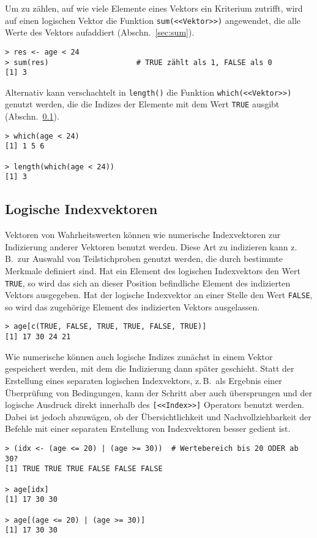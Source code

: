 Um zu zählen, auf wie viele Elemente eines Vektors ein Kriterium zutrifft, wird auf einen logischen Vektor die Funktion \lstinline!sum(<<Vektor>>)! angewendet, die alle Werte des Vektors aufaddiert (Abschn.\ \ref{sec:sum}).
\begin{lstlisting}
> res <- age < 24
> sum(res)                    # TRUE zählt als 1, FALSE als 0
[1] 3
\end{lstlisting}

Alternativ kann verschachtelt in \lstinline!length()! die Funktion \lstinline!which(<<Vektor>>)! genutzt werden, die die Indizes der Elemente mit dem Wert \lstinline!TRUE! ausgibt (Abschn.\ \ref{sec:which}).
\begin{lstlisting}
> which(age < 24)
[1] 1 5 6

> length(which(age < 24))
[1] 3
\end{lstlisting}

\subsection{Logische Indexvektoren}
\label{sec:which}

Vektoren von Wahrheitswerten können wie numerische Indexvektoren zur Indizierung anderer Vektoren benutzt werden. Diese Art zu indizieren kann z.\,B.\ zur Auswahl von Teilstichproben genutzt werden, die durch bestimmte Merkmale definiert sind. Hat ein Element des logischen Indexvektors den Wert \lstinline!TRUE!, so wird das sich an dieser Position befindliche Element des indizierten Vektors ausgegeben. Hat der logische Indexvektor an einer Stelle den Wert \lstinline!FALSE!, so wird das zugehörige Element des indizierten Vektors ausgelassen.
\begin{lstlisting}
> age[c(TRUE, FALSE, TRUE, TRUE, FALSE, TRUE)]
[1] 17 30 24 21
\end{lstlisting}

Wie numerische können auch logische Indizes zunächst in einem Vektor gespeichert werden, mit dem die Indizierung dann später geschieht. Statt der Erstellung eines separaten logischen Indexvektors, z.\,B.\ als Ergebnis einer Überprüfung von Bedingungen, kann der Schritt aber auch übersprungen und der logische Ausdruck direkt innerhalb des \lstinline![<<Index>>]! Operators benutzt werden. Dabei ist jedoch abzuwägen, ob der Übersichtlichkeit und Nachvollziehbarkeit der Befehle mit einer separaten Erstellung von Indexvektoren besser gedient ist.
\begin{lstlisting}
> (idx <- (age <= 20) | (age >= 30))  # Wertebereich bis 20 ODER ab 30?
[1] TRUE TRUE TRUE FALSE FALSE FALSE

> age[idx]
[1] 17 30 30

> age[(age <= 20) | (age >= 30)]
[1] 17 30 30
\end{lstlisting}

